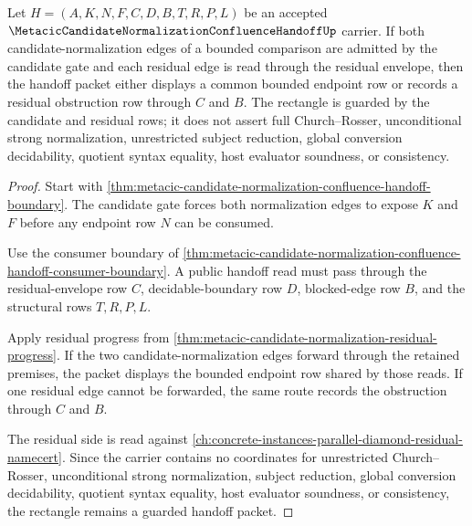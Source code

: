 \begin{theorem}
\label{thm:metacic-candidate-normalization-confluence-rectangle}
Let $H=(A,K,N,F,C,D,B,T,R,P,L)$ be an accepted $\MetacicCandidateNormalizationConfluenceHandoffUp$ carrier. If both candidate-normalization edges of a bounded comparison are admitted by the candidate gate and each residual edge is read through the residual envelope, then the handoff packet either displays a common bounded endpoint row or records a residual obstruction row through $C$ and $B$. The rectangle is guarded by the candidate and residual rows; it does not assert full Church--Rosser, unconditional strong normalization, unrestricted subject reduction, global conversion decidability, quotient syntax equality, host evaluator soundness, or consistency.
\end{theorem}
\begin{proof}
Start with \autoref{thm:metacic-candidate-normalization-confluence-handoff-boundary}. The candidate gate forces both normalization edges to expose $K$ and $F$ before any endpoint row $N$ can be consumed.

Use the consumer boundary of \autoref{thm:metacic-candidate-normalization-confluence-handoff-consumer-boundary}. A public handoff read must pass through the residual-envelope row $C$, decidable-boundary row $D$, blocked-edge row $B$, and the structural rows $T,R,P,L$.

Apply residual progress from \autoref{thm:metacic-candidate-normalization-residual-progress}. If the two candidate-normalization edges forward through the retained premises, the packet displays the bounded endpoint row shared by those reads. If one residual edge cannot be forwarded, the same route records the obstruction through $C$ and $B$.

The residual side is read against \autoref{ch:concrete-instances-parallel-diamond-residual-namecert}. Since the carrier contains no coordinates for unrestricted Church--Rosser, unconditional strong normalization, subject reduction, global conversion decidability, quotient syntax equality, host evaluator soundness, or consistency, the rectangle remains a guarded handoff packet.
\end{proof}

